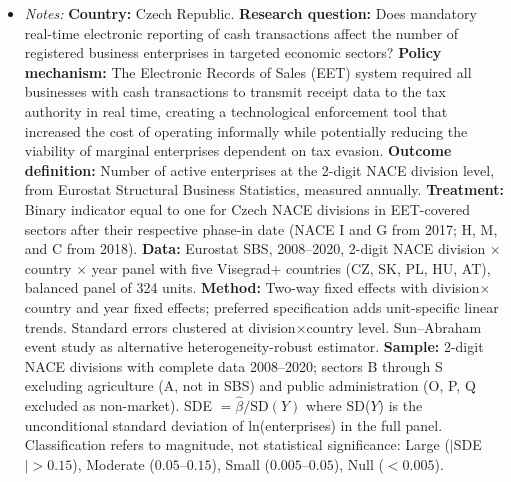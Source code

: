 \begin{table}[H]
\begin{threeparttable}
{\begin{itemize}[leftmargin=*]
\item \textit{Notes:} \textbf{Country:} Czech Republic. \textbf{Research question:} Does mandatory real-time electronic reporting of cash transactions affect the number of registered business enterprises in targeted economic sectors? \textbf{Policy mechanism:} The Electronic Records of Sales (EET) system required all businesses with cash transactions to transmit receipt data to the tax authority in real time, creating a technological enforcement tool that increased the cost of operating informally while potentially reducing the viability of marginal enterprises dependent on tax evasion. \textbf{Outcome definition:} Number of active enterprises at the 2-digit NACE division level, from Eurostat Structural Business Statistics, measured annually. \textbf{Treatment:} Binary indicator equal to one for Czech NACE divisions in EET-covered sectors after their respective phase-in date (NACE I and G from 2017; H, M, and C from 2018). \textbf{Data:} Eurostat SBS, 2008--2020, 2-digit NACE division $\times$ country $\times$ year panel with five Visegrad+ countries (CZ, SK, PL, HU, AT), balanced panel of 324 units. \textbf{Method:} Two-way fixed effects with division$\times$country and year fixed effects; preferred specification adds unit-specific linear trends. Standard errors clustered at division$\times$country level. Sun--Abraham event study as alternative heterogeneity-robust estimator. \textbf{Sample:} 2-digit NACE divisions with complete data 2008--2020; sectors B through S excluding agriculture (A, not in SBS) and public administration (O, P, Q excluded as non-market). SDE $= \hat{\beta} / \text{SD}(Y)$ where SD($Y$) is the unconditional standard deviation of ln(enterprises) in the full panel. Classification refers to magnitude, not statistical significance: Large ($|$SDE$| > 0.15$), Moderate ($0.05$--$0.15$), Small ($0.005$--$0.05$), Null ($< 0.005$).
\end{itemize}
}
\end{threeparttable}
\end{table}

